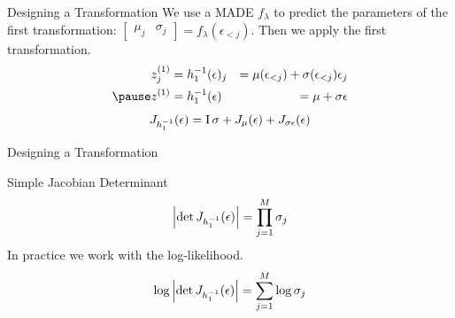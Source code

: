 \begin{frame}{Designing a Transformation}
We use a MADE $ f_{\lambda} $ to predict the parameters of the first transformation: $ \begin{bmatrix} \mu_{j} & \sigma_{j} \end{bmatrix} =  f_{\lambda}(\epsilon_{<j}) $.
Then we apply the first transformation.
\begin{equation*}
\begin{aligned}
z^{(1)}_{j} &= h^{-1}_{1}(\epsilon)_{j} &= \mu(\epsilon_{<j}) + \sigma(\epsilon_{<j}) \epsilon_{j} \\ \pause
z^{(1)} &= h^{-1}_{1}(\epsilon) &= \mu + \sigma \epsilon
\end{aligned}
\end{equation*}
\pause
\begin{equation*}
J_{h^{-1}_{1}}(\epsilon) = \operatorname{I} \sigma + J_{\mu}(\epsilon) +J_{\sigma \epsilon}(\epsilon)
\end{equation*}
\end{frame}

\begin{frame}{Designing a Transformation}
\begin{block}{Simple Jacobian Determinant}
\begin{equation*}
\abs{\det J_{h^{-1}_{1}}(\epsilon)} = \prod_{j=1}^{M}\sigma_{j}
\end{equation*}
In practice we work with the log-likelihood.
\begin{equation*}
\log\abs{\det J_{h^{-1}_{1}}(\epsilon)} = \sum_{j=1}^{M}\log\sigma_{j}
\end{equation*}
\end{block}
\end{frame}

